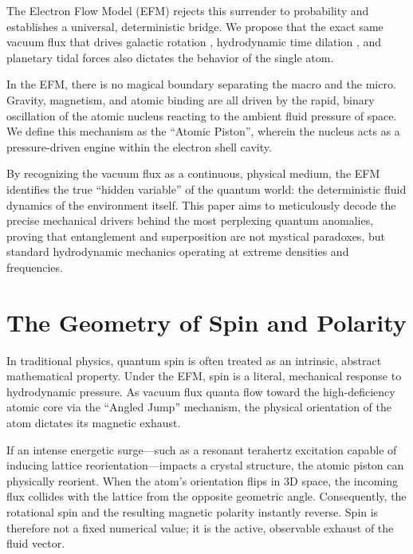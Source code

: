\documentclass[11pt, a4paper]{article}
\begin{document}
  The Electron Flow Model (EFM) rejects this surrender to probability and establishes a universal, deterministic bridge. We propose that the exact same vacuum flux that drives galactic rotation \cite{marabut2026m12}, hydrodynamic time dilation \cite{marabut2026m13}, and planetary tidal forces \cite{marabut2026m1} also dictates the behavior of the single atom. 
  
  \clearpage
  In the EFM, there is no magical boundary separating the macro and the micro. Gravity, magnetism, and atomic binding are all driven by the rapid, binary oscillation of the atomic nucleus reacting to the ambient fluid pressure of space. We define this mechanism as the ``Atomic Piston'', wherein the nucleus acts as a pressure-driven engine within the electron shell cavity. 
  
  By recognizing the vacuum flux as a continuous, physical medium, the EFM identifies the true ``hidden variable'' of the quantum world: the deterministic fluid dynamics of the environment itself. This paper aims to meticulously decode the precise mechanical drivers behind the most perplexing quantum anomalies, proving that entanglement and superposition are not mystical paradoxes, but standard hydrodynamic mechanics operating at extreme densities and frequencies.

\section{The Geometry of Spin and Polarity}
  In traditional physics, quantum spin is often treated as an intrinsic, abstract mathematical property. Under the EFM, spin is a literal, mechanical response to hydrodynamic pressure. As vacuum flux quanta flow toward the high-deficiency atomic core via the ``Angled Jump'' mechanism, the physical orientation of the atom dictates its magnetic exhaust. 
  
  If an intense energetic surge---such as a resonant terahertz excitation capable of inducing lattice reorientation---impacts a crystal structure, the atomic piston can physically reorient. When the atom's orientation flips in 3D space, the incoming flux collides with the lattice from the opposite geometric angle. Consequently, the rotational spin and the resulting magnetic polarity instantly reverse. Spin is therefore not a fixed numerical value; it is the active, observable exhaust of the fluid vector.
  
\end{document}
